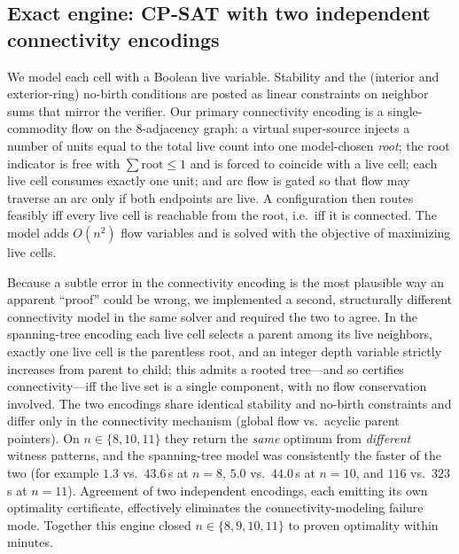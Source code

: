 \documentclass{article}
\begin{document}
\subsection{Exact engine: CP-SAT with two independent connectivity encodings}
\label{sec:cpsat}
We model each cell with a Boolean live variable. Stability and the (interior and exterior-ring) no-birth conditions are posted as linear constraints on neighbor sums that mirror the verifier. Our primary connectivity encoding is a single-commodity flow on the $8$-adjacency graph: a virtual super-source injects a number of units equal to the total live count into one model-chosen \emph{root}; the root indicator is free with $\sum \text{root}\le 1$ and is forced to coincide with a live cell; each live cell consumes exactly one unit; and arc flow is gated so that flow may traverse an arc only if both endpoints are live. A configuration then routes feasibly iff every live cell is reachable from the root, i.e.\ iff it is connected. The model adds $O(n^2)$ flow variables and is solved with the objective of maximizing live cells.

Because a subtle error in the connectivity encoding is the most plausible way an apparent ``proof'' could be wrong, we implemented a second, structurally different connectivity model in the same solver and required the two to agree. In the spanning-tree encoding each live cell selects a parent among its live neighbors, exactly one live cell is the parentless root, and an integer depth variable strictly increases from parent to child; this admits a rooted tree---and so certifies connectivity---iff the live set is a single component, with no flow conservation involved. The two encodings share identical stability and no-birth constraints and differ only in the connectivity mechanism (global flow vs.\ acyclic parent pointers). On $n\in\{8,10,11\}$ they return the \emph{same} optimum from \emph{different} witness patterns, and the spanning-tree model was consistently the faster of the two (for example $1.3$ vs.\ $43.6$\,s at $n=8$, $5.0$ vs.\ $44.0$\,s at $n=10$, and $116$ vs.\ $323$\,s at $n=11$). Agreement of two independent encodings, each emitting its own optimality certificate, effectively eliminates the connectivity-modeling failure mode. Together this engine closed $n\in\{8,9,10,11\}$ to proven optimality within minutes.
\end{document}
